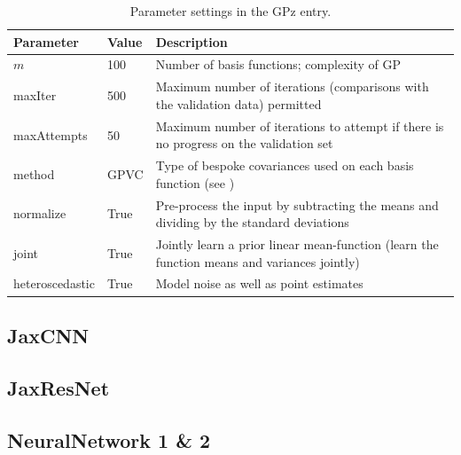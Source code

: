 \documentclass[twocolumn,twocolappendix]{aastex63}
\begin{document}
\begin{table}[]
\begin{center}
    \begin{tabular}{| l | l | l |}
    \hline
    Parameter   &   Value   &   Description\\  
    \hline 
    $m$         &   100     &   Number of basis functions; complexity of GP\\

    maxIter     &   500     &   Maximum number of iterations (comparisons with 
                                the validation data) permitted\\

    maxAttempts &   50      &   Maximum number of iterations to attempt if there 
                                is no progress on the validation set\\

    method      &   GPVC    &   Type of bespoke covariances used on each basis 
                                function (see \citealp{Almosallam2016b})\\

    normalize   &   True    &   Pre-process the input by subtracting the means
                                and dividing by the standard deviations\\

    joint       &   True    &   Jointly learn a prior linear mean-function 
                                (learn the function means and variances 
                                jointly)\\

    heteroscedastic  & True & Model noise as well as point estimates \\
    \hline
    \end{tabular}
\caption{Parameter settings in the GPz entry.}
\end{center}
\label{table-settings}
\end{table}

\subsection{ {\sc JaxCNN} }


\subsection{ {\sc JaxResNet} }


\subsection{ {\sc NeuralNetwork 1 \& 2} }
\end{document}
